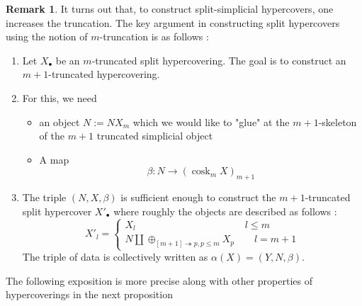 \documentclass[a4paper]{amsart}
\theoremstyle{definition}
\newtheorem{remark}[theorem]{Remark}
\begin{document}
\begin{remark}
  It turns out that, to construct split-simplicial hypercovers, one increases the truncation. The key argument in constructing split hypercovers using the notion of $m$-truncation is as follows :
    \begin{enumerate}
        \item Let $X_{\bullet}$ be an $m$-truncated split hypercovering. The goal is to construct an $m+1$-truncated hypercovering. 
        
        \item For this, we need 
        \begin{itemize}
            \item an object $N:=NX_m$ which we would like to "glue" at the $m+1$-skeleton of the $m+1$ truncated simplicial object 
            \item A map 
            \begin{equation}
                \beta : N \to (\operatorname{cosk}_mX)_{m+1}
            \end{equation}
        \end{itemize}
        \item The triple $(N,X,\beta)$ is sufficient enough to construct the $m+1$-truncated split hypercover $X'_{\bullet}$
        where roughly the objects are described as follows :
        \begin{equation}
            X'_l = \begin{cases}
                X_l \quad \quad \quad \quad \quad \quad \quad \quad \quad \quad \quad l \le m \\
                N \coprod \oplus_{[m+1] \twoheadrightarrow p, p \le m} X_p \quad \quad l= m+1
            \end{cases}
        \end{equation}
        The triple of data is collectively written as $\alpha(X)= (Y,N,\beta)$.
    \end{enumerate}
    The following exposition is more precise along with other properties of hypercoverings in the next proposition
\end{remark}
\end{document}
